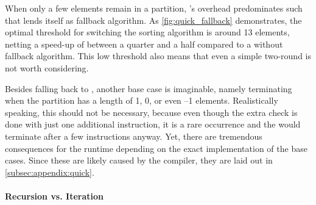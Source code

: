 When only a few elements remain in a partition, \QS{}'s overhead predominates such that \IS{} lends itself as fallback algorithm.
As \cref{fig:quick_fallback} demonstrates, the optimal threshold for switching the sorting algorithm is around 13 elements, netting a speed-up of between a quarter and a half compared to a \QS{} without fallback algorithm.
This low threshold also means that even a simple two-round \ShS{} is not worth considering.

Besides falling back to \IS{}, another base case is imaginable, namely terminating when the partition has a length of 1, 0, or even --1 elements.
Realistically speaking, this should not be necessary, because even though the extra check is done with just one additional instruction, it is a rare occurrence and the \IS{} would terminate after a few instructions anyway.
Yet, there are tremendous consequences for the runtime depending on the exact implementation of the base cases.
Since these are likely caused by the compiler, they are laid out in \cref{subsec:appendix:quick}.

\paragraph{Recursion vs. Iteration}

%

